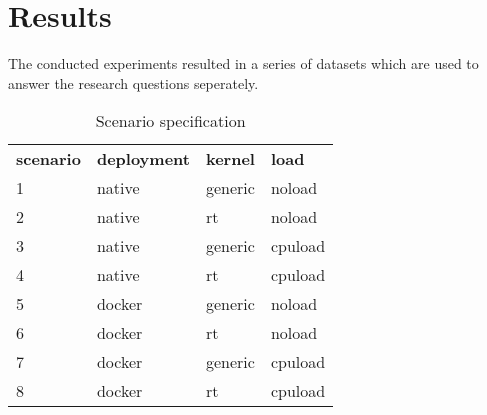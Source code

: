 \iffalse  \fi
\chapter{Results}

The conducted experiments resulted in a series of datasets which are used to answer the research questions seperately. 




\begin{table}[]
\centering
\caption{Scenario specification}
\label{my-label}
\begin{tabular}{llll}
\textbf{scenario} & \textbf{deployment} & \textbf{kernel} & \textbf{load} \\
1                 & native              & generic         & noload        \\
2                 & native              & rt              & noload        \\
3                 & native              & generic         & cpuload       \\
4                 & native              & rt              & cpuload       \\
5                 & docker              & generic         & noload        \\
6                 & docker              & rt              & noload        \\
7                 & docker              & generic         & cpuload       \\
8                 & docker              & rt              & cpuload      
\end{tabular}
\end{table}

